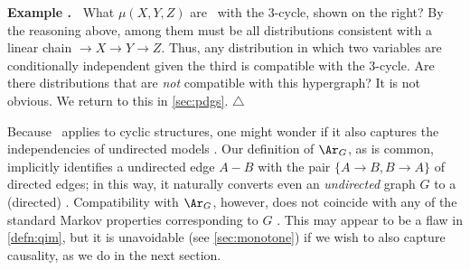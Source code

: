 \newlength{\cycleboxlen}
\newsavebox\cyclebox
\sbox{}
\settowidth{\cycleboxlen}{\usebox{\cyclebox}}
\addtolength{\cycleboxlen}{1em}
\begin{wrapfigure}[4]{o}{\cycleboxlen}
    \vspace{-0.8em}
    \hfill
    \usebox\cyclebox
\end{wrapfigure}
\label{example:xyz-cycle-1}
\textbf{Example {\theexample}.~} 
    What $\mu(X,Y,Z)$ are \cible\ with the 3-cycle, shown on the right?
    By the reasoning above,
     among them must be all distributions consistent with a linear chain ${\to}X{\to}Y{\to}Z$. Thus,  
    any distribution in which two variables are conditionally independent given the third is compatible with the 3-cycle.
    Are there
    distributions that are \emph{not} compatible with 
    this hypergraph? It is not obvious. We return to this
     in \cref{sec:pdgs}. 
\hfill$\triangle$



Because \scibility\ applies to cyclic structures,  one might wonder if
    it also captures the independencies of undirected models 
    \unskip.
Our definition of $\Ar_G$, as is common, implicitly identifies a undirected edge $A {-} B$ with the pair $\{ A{\to}B, B{\to}A\}$ of directed edges;
in this way, it naturally converts even an \emph{undirected} graph $G$ to a (directed) \hgraph. 
Compatibility with $\Ar_G$, however, does not coincide with any of the standard Markov properties
corresponding to $G$ \citep{KF09}.
This may appear to be a flaw in \cref{defn:qim},
but it is unavoidable (see \cref{sec:monotone}) if we wish to also capture causality, as we do in the next section. 


